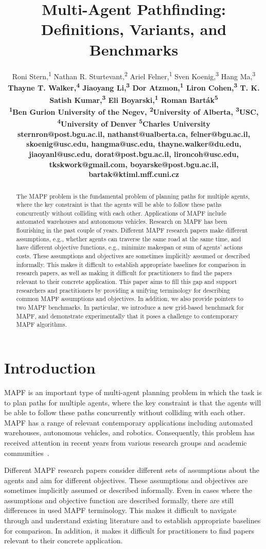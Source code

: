 \documentclass[letterpaper]{article} %
\title{Multi-Agent Pathfinding: Definitions, Variants, and Benchmarks}
\author{
Roni Stern,\textsuperscript{\rm 1}
Nathan R. Sturtevant,\textsuperscript{\rm 2}
Ariel Felner,\textsuperscript{\rm 1}
Sven Koenig,\textsuperscript{\rm 3}
Hang Ma,\textsuperscript{\rm 3}\\
\bf \Large Thayne T. Walker,\textsuperscript{\rm 4}
Jiaoyang Li,\textsuperscript{\rm 3}
Dor Atzmon,\textsuperscript{\rm 1}
Liron Cohen,\textsuperscript{\rm 3}
T. K. Satish Kumar,\textsuperscript{\rm 3}
Eli Boyarski,\textsuperscript{\rm 1}
Roman Bart\'{a}k\textsuperscript{\rm 5} \\
\textsuperscript{\rm 1}Ben Gurion University of the Negev,
\textsuperscript{\rm 2}University of Alberta,
\textsuperscript{\rm 3}USC,
\textsuperscript{\rm 4}University of Denver
\textsuperscript{\rm 5}Charles University\\
sternron@post.bgu.ac.il,
nathanst@ualberta.ca,
felner@bgu.ac.il,
skoenig@usc.edu,
hangma@usc.edu,
thayne.walker@du.edu,\\
jiaoyanl@usc.edu,
dorat@post.bgu.ac.il,
lironcoh@usc.edu,
tkskwork@gmail.com,
boyarske@post.bgu.ac.il,
bartak@ktiml.mff.cuni.cz
}
\newcommand{\mapf}{\ac{MAPF}\xspace}
\begin{document}
\maketitle

\begin{abstract}	The \mapf problem is the fundamental problem of planning paths for multiple agents, where the key constraint is that the agents will be able to follow these paths concurrently without colliding with each other. Applications of \mapf include automated warehouses and autonomous vehicles. Research on \mapf has been flourishing in the past couple of years.
	Different \mapf research papers make different assumptions, e.g., whether agents can traverse the same road at the same time, and have different objective functions, e.g., minimize makespan or sum of agents' actions costs.
	These assumptions and objectives are sometimes implicitly assumed or described informally. This makes it difficult to establish appropriate baselines for comparison in research papers, as well as making it difficult for practitioners to find the papers relevant to their concrete application.
	This paper aims to fill this gap and support researchers and practitioners by providing a unifying terminology for describing common \mapf assumptions and objectives. In addition, we also provide pointers to two \mapf benchmarks. In particular, we introduce a new grid-based benchmark for \mapf, and demonstrate experimentally that it poses a challenge to contemporary \mapf algorithms.
\end{abstract}


\section{Introduction}

\mapf is an important type of multi-agent planning problem in which the task is to plan paths for multiple agents,
where the key constraint is that the agents will be able to follow these paths concurrently without colliding with each other. \mapf has a range of relevant contemporary applications including automated warehouses, autonomous vehicles, and robotics. Consequently, this problem has received attention in recent years from various research groups and academic communities~\cite{standley2010finding,felner2017search,surynek2016empirical,bartak2018aScheduling,cohen2018anytime,li2019multi,MaAAAI19a}.

Different \mapf research papers consider different sets of assumptions about the agents and aim for different objectives. These assumptions and objectives are sometimes implicitly assumed or described informally. Even in cases where the assumptions and objective function are described formally, there are still differences in used \mapf terminology. This makes it difficult to navigate through and understand existing literature and to establish appropriate baselines for comparison. In addition, it makes it difficult for practitioners to find papers relevant to their concrete application.
\end{document}
